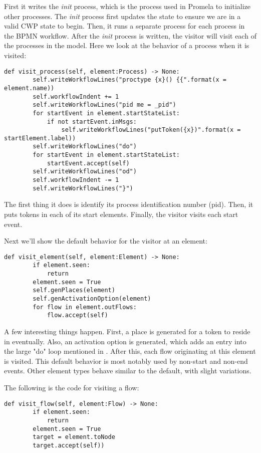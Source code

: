 First it writes the \emph{init} process, which is the process used in Promela to initialize other processes. The \emph{init} process first updates the state to ensure we are in a valid CWP state to begin. Then, it runs a separate process for each process in the BPMN workflow. After the \emph{init} process is written, the visitor will visit each of the processes in the model. Here we look at the behavior of a process when it is visited:
\begin{lstlisting}[style=myPython]
    def visit_process(self, element:Process) -> None:
        self.writeWorkflowLines("proctype {x}() {{".format(x = element.name))
        self.workflowIndent += 1
        self.writeWorkflowLines("pid me = _pid")
        for startEvent in element.startStateList:
            if not startEvent.inMsgs:
                self.writeWorkflowLines("putToken({x})".format(x = startElement.label))
        self.writeWorkflowLines("do")
        for startEvent in element.startStateList:
            startEvent.accept(self)
        self.writeWorkflowLines("od")
        self.workflowIndent -= 1
        self.writeWorkflowLines("}")
\end{lstlisting}

The first thing it does is identify its process identification number (pid). Then, it puts tokens in each of its start elements. Finally, the visitor visits each start event.

Next we'll show the default behavior for the visitor at an element:

\begin{lstlisting}[style=myPython]
    def visit_element(self, element:Element) -> None:
        if element.seen:
            return
        element.seen = True
        self.genPlaces(element)
        self.genActivationOption(element)
        for flow in element.outFlows:
            flow.accept(self)
\end{lstlisting}

A few interesting things happen. First, a place is generated for a token to reside in eventually. Also, an activation option is generated, which adds an entry into the large "do" loop mentioned in . After this, each flow originating at this element is visited. This default behavior is most notably used by non-start and non-end events. Other element types behave similar to the default, with slight variations.

The following is the code for visiting a flow:

\begin{lstlisting}[style=myPython]
    def visit_flow(self, element:Flow) -> None:
        if element.seen:
            return
        element.seen = True
        target = element.toNode
        target.accept(self))
\end{lstlisting}

